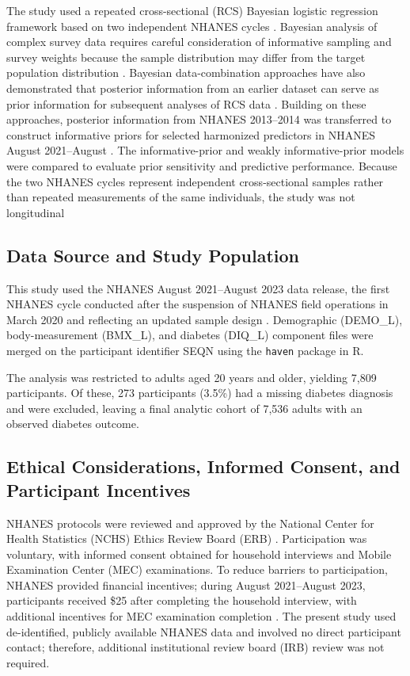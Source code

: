 \documentclass[11pt]{article}
\begin{document}
The study used a repeated cross-sectional (RCS) Bayesian logistic regression
framework based on two independent NHANES cycles \cite{Stival2026}. Bayesian analysis of complex survey data requires careful consideration of
informative sampling and survey weights because the sample distribution may
differ from the target population distribution \cite{Savitsky2024Informative} . Bayesian data-combination approaches have also
demonstrated that posterior information from an earlier dataset can serve as
prior information for subsequent analyses of RCS data
\cite{PelzerEisinga2002}. Building on these approaches, posterior information from
NHANES 2013--2014 \cite{CDC20132014NHANES} was transferred to construct informative priors for
selected harmonized predictors in NHANES August 2021--August  \citep{NCHS2023}. The
informative-prior and weakly informative-prior models were compared to
evaluate prior sensitivity and predictive performance. Because the two
NHANES cycles represent independent cross-sectional samples rather than
repeated measurements of the same individuals, the study was not
longitudinal \cite{Lebo2015}

 \subsection{Data Source and Study Population}
This study used the NHANES August 2021--August 2023 data release, the first
NHANES cycle conducted after the suspension of NHANES field operations in
March 2020 and reflecting an updated sample design \citep{NCHS2023}.
Demographic (DEMO\_L), body-measurement (BMX\_L), and diabetes (DIQ\_L)
component files were merged on the participant identifier SEQN using the
\texttt{haven} package in R. 

The analysis was restricted to adults aged 20
years and older, yielding 7,809 participants. Of these, 273 participants
(3.5\%) had a missing diabetes diagnosis and were excluded, leaving a final
analytic cohort of 7,536 adults with an observed diabetes outcome.  








\subsection{Ethical Considerations, Informed Consent, and Participant Incentives}

NHANES protocols were reviewed and approved by the National Center for
Health Statistics (NCHS) Ethics Review Board (ERB) \cite{CDC2026NHANESERB}.
Participation was voluntary, with informed consent obtained for household
interviews and Mobile Examination Center (MEC) examinations. To reduce barriers to participation, NHANES provided financial
incentives; during August 2021--August 2023, participants received \$25
after completing the household interview, with additional incentives for
MEC examination completion
\cite{Terry2024NHANES}. The present study used de-identified, publicly
available NHANES data and involved no direct participant contact;
therefore, additional institutional review board (IRB) review was not
required. 
\end{document}
